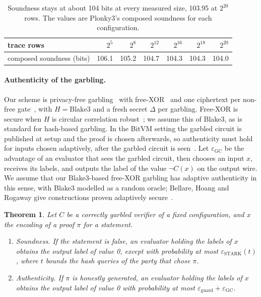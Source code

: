 \documentclass[11pt]{article}
\newtheorem{theorem}{Theorem}
\newcommand{\blake}{\mathrm{Blake3}}
\begin{document}
\begin{table}[t]\centering\small
\begin{tabular}{lrrrrrr}\toprule
trace rows & $2^5$ & $2^8$ & $2^{12}$ & $2^{16}$ & $2^{18}$ & $2^{20}$\\\midrule
composed soundness (bits) & 106.1 & 105.2 & 104.7 & 104.3 & 104.3 & 104.0\\\bottomrule
\end{tabular}
\caption{Soundness stays at about 104 bits at every measured size, 103.95 at $2^{20}$ rows. The values are
Plonky3's composed soundness for each configuration.}
\label{tab:security}
\end{table}

\paragraph{Authenticity of the garbling.} Our scheme is privacy-free
garbling~\cite{fno15privacyfree} with free-XOR~\cite{ks08} and one ciphertext per
non-free gate~\cite{zre15}, with $H=\blake$ and a fresh secret $\Delta$ per
garbling. Free-XOR is secure when $H$ is circular correlation
robust~\cite{ckkz12freexor}; we assume this of Blake3, as is standard for
hash-based garbling. In the BitVM setting the garbled circuit is published at
setup and the proof is chosen afterwards, so authenticity must hold for inputs
chosen adaptively, after the garbled circuit is seen~\cite{bhr12adaptive}. Let
$\varepsilon_{\mathrm{GC}}$ be the advantage of an evaluator that sees the garbled
circuit, then chooses an input $x$, receives its labels, and outputs the label of
the value $\neg C(x)$ on the output wire. We assume that our Blake3-based
free-XOR garbling has adaptive authenticity in this sense, with Blake3 modelled as
a random oracle; Bellare, Hoang and Rogaway give constructions proven adaptively
secure~\cite{bhr12adaptive}.

\begin{theorem}\label{thm:main}
Let $C$ be a correctly garbled verifier of a fixed configuration, and $x$ the
encoding of a proof $\pi$ for a statement.
\begin{enumerate}
  \item[(i)] \emph{Soundness.} If the statement is false, an evaluator holding the
    labels of $x$ obtains the output label of value 0, except with probability at
    most $\varepsilon_{\mathrm{STARK}}(t)$, where $t$ bounds the hash queries of
    the party that chose $\pi$.
  \item[(ii)] \emph{Authenticity.} If $\pi$ is honestly generated, an evaluator
    holding the labels of $x$ obtains the output label of value 0 with probability
    at most $\varepsilon_{\mathrm{guard}}+\varepsilon_{\mathrm{GC}}$.
\end{enumerate}
\end{theorem}
\end{document}
